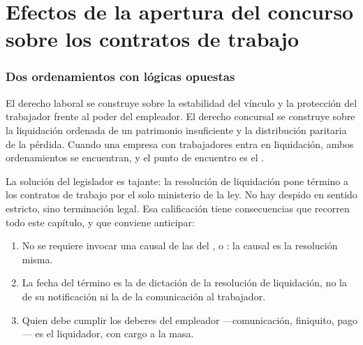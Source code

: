 \chapter{Efectos de la apertura del concurso sobre los contratos de trabajo}
\label{cap:laboral-efectos}


\bloqueTeorico

\subsection{Dos ordenamientos con lógicas opuestas}

El derecho laboral se construye sobre la estabilidad del vínculo y la protección del
trabajador frente al poder del empleador. El derecho concursal se construye sobre la
liquidación ordenada de un patrimonio insuficiente y la distribución paritaria de la
pérdida. Cuando una empresa con trabajadores entra en liquidación, ambos ordenamientos se
encuentran, y el punto de encuentro es el  \citeyearpar{codigo-trabajo}.

La solución del legislador es tajante: la resolución de liquidación pone término a los
contratos de trabajo por el solo ministerio de la ley. No hay despido en sentido
estricto, sino terminación legal. Esa calificación tiene consecuencias que recorren todo
este capítulo, y que conviene anticipar:

\begin{enumerate}
  \item No se requiere invocar una causal de las del ,  o
  : la causal es la resolución misma.
  \item La fecha del término es la de dictación de la resolución de liquidación, no la de
  su notificación ni la de la comunicación al trabajador.
  \item Quien debe cumplir los deberes del empleador ---comunicación, finiquito, pago---
  es el liquidador, con cargo a la masa.
\end{enumerate}

